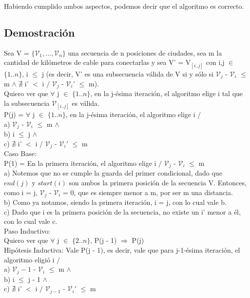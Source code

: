 \documentclass{article}
\theoremstyle{definition}
\theoremstyle{remark}
\begin{document}
Habiendo cumplido ambos aspectos, podemos decir que el algoritmo es correcto.

\subsection{Demostración}

Sea V = $\{\mathcal{V}_1,..., \mathcal{V}_n\}$ una secuencia de n posiciones de ciudades, sea m la cantidad de kilómetros de cable para conectarlas y sea V' = V$_[i..j]$ con i,j $\in$ $\{1..n\}$, i $\leq$ j (es decir, V' es una subsecuencia válida de V si y sólo si $\mathcal{V}_j$ - $\mathcal{V}_i$ $\leq$ m $\wedge$ $\nexists$ i' $<$ i $/$ $\mathcal{V}_j$ - $\mathcal{V}_i'$ $\leq$ m). \\

Quiero ver que $\forall$ j $\in$ $\{1..n\}$, en la j-ésima iteración, el algoritmo elige i tal que la subsecuencia $\mathcal{V}_[i..j]$ es válida.\\

P(j) = $\forall$ j $\in$ $\{1..n\}$, en la j-ésima iteración, el algoritmo elige i $/$ \\
a) $\mathcal{V}_j$ -  $\mathcal{V}_i$ $\leq$ m $\wedge$ \\
b) i $\leq$ j $\wedge$ \\
c) $\nexists$ i' $<$ i $/$ $\mathcal{V}_j$ - $\mathcal{V}_i'$ $\leq$ m \\

Caso Base:\\
P(1) = En la primera iteración, el algoritmo elige i $/$ $\mathcal{V}_j$ - $\mathcal{V}_i$ $\leq$ m \\

a) Notemos que no se cumple la guarda del primer condicional, dado que $end(j)$ y $start(i)$ son ambos la primera posición de la secuencia V. Entonces, como i = j, $\mathcal{V}_j$ -  $\mathcal{V}_i$ = 0, que es siempre menor a m, por ser m una distancia. \\

b) Como ya notamos, siendo la primera iteración, i = j, con lo cual vale b. \\

c) Dado que i es la primera posición de la secuencia, no existe un i' menor a él, con lo cual vale c.\\

Paso Inductivo:\\
Quiero ver que $\forall$ j $\in$ $\{2..n\}$, P(j - 1) $\Rightarrow$ P(j) \\ 
Hipótesis Inductiva: Vale P(j - 1), es decir, vale que para j-1-ésima iteración, el algoritmo eligió i $/$ \\
a) $\mathcal{V}_j-1$ - $\mathcal{V}_i$ $\leq$ m $\wedge$ \\
b) i $\leq$ j - 1 $\wedge$\\
c) $\nexists$ i' $<$ i $/$ $\mathcal{V}_{j-1}$ - $\mathcal{V}_i'$ $\leq$ m \\
\end{document}
